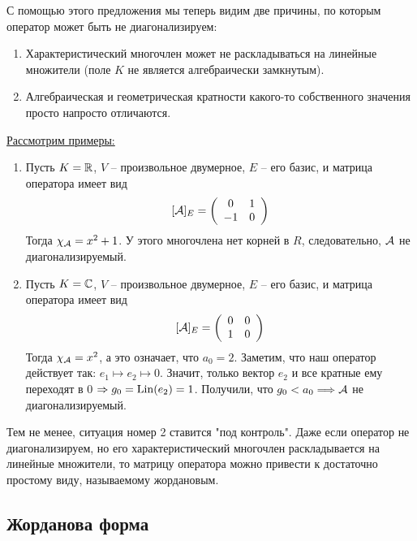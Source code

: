 С помощью этого предложения мы теперь видим две причины, по которым оператор может быть не диагонализируем:
\begin{enumerate}
    \item Характеристический многочлен может не раскладываться на линейные множители (поле $K$ не является алгебраически замкнутым).
    \item Алгебраическая и геометрическая кратности какого-то собственного значения просто напросто отличаются.
\end{enumerate}

\vspace*{4mm}

\underline{Рассмотрим примеры:}
\begin{enumerate}
    \item Пусть $ K = \mathbb{R}$, $V$ -- произвольное двумерное, $E$ -- его базис, и матрица оператора имеет вид \[ [\mathcal{A}]_{E} = \left(\begin{array}{cc}
    0 & 1 \\ 
    -1 & 0
    \end{array}\right) \] 
    Тогда $\chi_{\mathcal{A}} = x^2 + 1$. 
    У этого многочлена нет корней в $R$, следовательно, $\mathcal{A}$ не диагонализируемый.

    \item Пусть $K = \mathbb{C}$, $V$ -- произвольное двумерное, $E$ -- его базис, и матрица оператора имеет вид
    \[ [\mathcal{A}]_{E} = \left(\begin{array}{cc}
        0 & 0 \\ 
        1 & 0
    \end{array}\right)\] 
    Тогда $\chi_{\mathcal{A}} = x^2$, а это означает, что $a_0 = 2$.
    Заметим, что наш оператор действует так: $e_1 \mapsto e_2 \mapsto 0$.
    Значит, только вектор $e_2$ и все кратные ему переходят в 0 $\Rightarrow g_0 = \operatorname{Lin}(e_2) = 1$.
    Получили, что $g_0 < a_0 \Longrightarrow \mathcal{A}$ не диагонализируемый.
\end{enumerate}

\vspace*{5mm}

Тем не менее, ситуация номер 2 ставится "под контроль".
Даже если оператор не диагонализируем, но его характеристический многочлен раскладывается на линейные множители, то матрицу оператора можно привести к достаточно простому виду, называемому жордановым.

\subsection{Жорданова форма}

